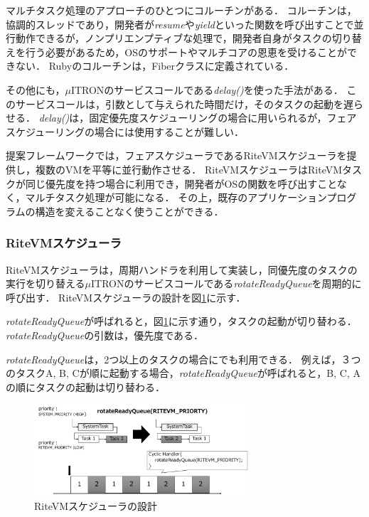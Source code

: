 \documentclass[submit,techrep]{ipsj}
\begin{document}
マルチタスク処理のアプローチのひとつにコルーチンがある．
コルーチンは，協調的スレッドであり，開発者が{\it resume}や{\it yield}といった関数を呼び出すことで並行動作できるが，ノンプリエンプティブな処理で，開発者自身がタスクの切り替えを行う必要があるため，OSのサポートやマルチコアの恩恵を受けることができない．
Rubyのコルーチンは，Fiberクラス\cite{url:co-routine}に定義されている．

その他にも，$\mu$ITRONのサービスコールである{\it delay()}を使った手法がある．
このサービスコールは，引数として与えられた時間だけ，そのタスクの起動を遅らせる．
{\it delay()}は，固定優先度スケジューリングの場合に用いられるが，フェアスケジューリングの場合には使用することが難しい．

提案フレームワークでは，フェアスケジューラであるRiteVMスケジューラを提供し，複数のVMを平等に並行動作させる．
RiteVMスケジューラはRiteVMタスクが同じ優先度を持つ場合に利用でき，開発者がOSの関数を呼び出すことなく，マルチタスク処理が可能になる．
その上，既存のアプリケーションプログラムの構造を変えることなく使うことができる． 

\subsubsection{RiteVMスケジューラ}
RiteVMスケジューラは，周期ハンドラを利用して実装し，同優先度のタスクの実行を切り替える$\mu$ITRONのサービスコールである{\it rotateReadyQueue}を周期的に呼び出す．
RiteVMスケジューラの設計を図\ref{fig:rotateReadyQueue}に示す．


{\it rotateReadyQueue}が呼ばれると，図\ref{fig:rotateReadyQueue}に示す通り，タスクの起動が切り替わる．
{\it rotateReadyQueue}の引数は，優先度である．

{\it rotateReadyQueue}は，2つ以上のタスクの場合にでも利用できる．
例えば，３つのタスクA, B, Cが順に起動する場合，{\it rotateReadyQueue}が呼ばれると，B, C, Aの順にタスクの起動は切り替わる．

\begin{figure}[t]
    \centering
    \includegraphics[width=8cm,clip]{../EMSOFT2016/figure/rotateReadyQueue.pdf}
    \vspace{-2mm}
    \caption{RiteVMスケジューラの設計}
\vspace{-5mm}
    \label{fig:rotateReadyQueue}
\end{figure} 
 
\end{document}
